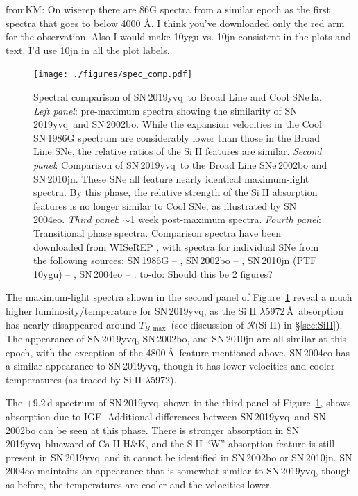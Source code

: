 \documentclass[twocolumn]{aastex63}
\def\ion#1#2{#1$\;${\footnotesize\rm{#2}}\relax}
\newcommand{\fromkate}[1]{{\color{brown} fromKM: {#1}}}
\newcommand{\todo}[1]{{\color{magenta} to-do: {#1}}}
\newcommand{\tbmax}{$T_{B,\mathrm{max}}$}
\newcommand{\sn}{SN\,2019yvq}
\begin{document}
\fromkate{On wiserep there are 86G spectra from a similar epoch as the first spectra that goes to below 4000 \AA. I think you've downloaded only the red arm for the observation. Also I would make 10ygu vs. 10jn consistent in the plots and text. I'd use 10jn in all the plot labels.}

\begin{figure}
    \centering
    \texttt{[image: ./figures/spec\_comp.pdf]}
    \caption{Spectral comparison of \sn\ to \citet{Branch06} Broad Line and
    Cool SNe\,Ia. \textit{Left panel}: pre-maximum spectra showing the
    similarity of \sn\ and SN\,2002bo. While the expansion velocities in the
    Cool SN\,1986G spectrum are considerably lower than those in the Broad
    Line SNe, the relative ratios of the \ion{Si}{II} features are similar.
    \textit{Second panel}: Comparison of \sn\ to the Broad Line SNe\,2002bo
    and SN\,2010jn. These SNe all feature nearly identical maximum-light
    spectra. By this phase, the relative strength of the \ion{Si}{II}
    absorption features is no longer similar to \citet{Branch06} Cool SNe, as
    illustrated by SN\,2004eo. \textit{Third panel}: $\sim$1 week post-maximum
    spectra. \textit{Fourth panel}: Transitional phase spectra. Comparison
    spectra have been downloaded from WISeREP \citep{Yaron12}, with spectra
    for individual SNe from the following sources: SN\,1986G --
    \citet{Cristiani92}, SN\,2002bo -- \citet{Benetti04,Silverman11},
    SN\,2010jn (PTF\,10ygu) -- \citet{Hachinger13,Maguire14}, SN\,2004eo --
    \citet{Pastorello07}. \todo{Should this be 2 figures?}}
    \label{fig:spec_comp}
\end{figure}

The maximum-light spectra shown in the second panel of
Figure~\ref{fig:spec_comp} reveal a much higher luminosity/temperature for
\sn, as the \ion{Si}{II} $\lambda$5972\,\AA\ absorption has nearly disappeared
around \tbmax\ (see discussion of $\mathcal{R}($\ion{Si}{II}$)$ in
\S\ref{sec:SiII}). The appearance of \sn, SN\,2002bo, and SN\,2010jn are all
similar at this epoch, with the exception of the 4800\,\AA\ feature mentioned
above. SN\,2004eo has a similar appearance to \sn, though it has lower
velocities and cooler temperatures (as traced by \ion{Si}{II} $\lambda$5972).

The $+9.2$\,d spectrum of \sn, shown in the third panel of
Figure~\ref{fig:spec_comp}, shows absorption due to IGE. Additional
differences between \sn\ and SN\,2002bo can be seen at this phase. There is
stronger absorption in \sn\ blueward of \ion{Ca}{II} H\&K, and the \ion{S}{II}
``W'' absorption feature is still present in \sn\ and it cannot be identified
in SN\,2002bo or SN\,2010jn. SN\,2004eo maintains an appearance that is
somewhat similar to \sn, though as before, the temperatures are cooler and the
velocities lower.
\end{document}

